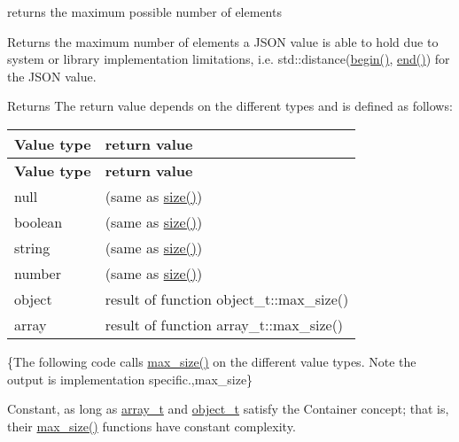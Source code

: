 returns the maximum possible number of elements 

Returns the maximum number of elements a J\+S\+ON value is able to hold due to system or library implementation limitations, i.\+e. {\ttfamily std\+::distance(\mbox{\hyperlink{classnlohmann_1_1basic__json_a0ff28dac23f2bdecee9564d07f51dcdc}{begin()}}, \mbox{\hyperlink{classnlohmann_1_1basic__json_a13e032a02a7fd8a93fdddc2fcbc4763c}{end()}})} for the J\+S\+ON value.

\begin{DoxyReturn}{Returns}
The return value depends on the different types and is defined as follows\+: \tabulinesep=1mm
\begin{longtabu} spread 0pt [c]{*{2}{|X[-1]}|}
\hline
\rowcolor{\tableheadbgcolor}\textbf{ Value type  }&\textbf{ return value   }\\
\endfirsthead
\hline
\endfoot
\hline
\rowcolor{\tableheadbgcolor}\textbf{ Value type  }&\textbf{ return value   }\\
\endhead
null  &{} (same as {\ttfamily \mbox{\hyperlink{classnlohmann_1_1basic__json_a25e27ad0c6d53c01871c5485e1f75b96}{size()}}})   \\
boolean  &{} (same as {\ttfamily \mbox{\hyperlink{classnlohmann_1_1basic__json_a25e27ad0c6d53c01871c5485e1f75b96}{size()}}})   \\
string  &{} (same as {\ttfamily \mbox{\hyperlink{classnlohmann_1_1basic__json_a25e27ad0c6d53c01871c5485e1f75b96}{size()}}})   \\
number  &{} (same as {\ttfamily \mbox{\hyperlink{classnlohmann_1_1basic__json_a25e27ad0c6d53c01871c5485e1f75b96}{size()}}})   \\
object  &result of function {\ttfamily object\+\_\+t\+::max\+\_\+size()}   \\
array  &result of function {\ttfamily array\+\_\+t\+::max\+\_\+size()}   \\
\end{longtabu}

\end{DoxyReturn}
\{The following code calls {\ttfamily \mbox{\hyperlink{classnlohmann_1_1basic__json_a2f47d3c6a441c57dd2be00449fbb88e1}{max\+\_\+size()}}} on the different value types. Note the output is implementation specific.,max\+\_\+size\}

Constant, as long as \mbox{\hyperlink{classnlohmann_1_1basic__json_ae095578e03df97c5b3991787f1056374}{array\+\_\+t}} and \mbox{\hyperlink{classnlohmann_1_1basic__json_a5e48a7893520e1314bf0c9723e26ea2a}{object\+\_\+t}} satisfy the Container concept; that is, their {\ttfamily \mbox{\hyperlink{classnlohmann_1_1basic__json_a2f47d3c6a441c57dd2be00449fbb88e1}{max\+\_\+size()}}} functions have constant complexity.

